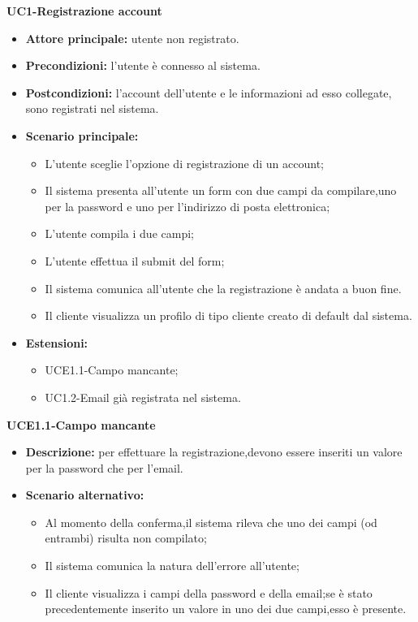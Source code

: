 \textbf{UC1-Registrazione account}
\begin{itemize}
    \item \textbf{Attore principale: }utente non registrato.
    \item \textbf{Precondizioni: }l'utente è connesso al sistema.
    \item \textbf{Postcondizioni: }l'account dell'utente e le informazioni ad esso collegate, sono registrati nel sistema.
    \item \textbf{Scenario principale:} 
        \begin{itemize}
            \item L'utente sceglie l'opzione di registrazione di un account;
            \item Il sistema presenta all'utente un form con due campi da compilare,uno per la password
            e uno per l'indirizzo di posta elettronica;
            \item L'utente compila i due campi;
            \item L'utente effettua il submit del form;
            \item Il sistema comunica all'utente che la registrazione è andata 
            a buon fine.
            \item Il cliente visualizza un profilo di tipo cliente creato di default dal sistema.
        \end{itemize}
    \item \textbf{Estensioni:}
        \begin{itemize}
                \item UCE1.1-Campo mancante;
                \item UC1.2-Email già registrata nel sistema.
        \end{itemize}
\end{itemize}
    
\textbf{UCE1.1-Campo mancante}
\begin{itemize}
    \item \textbf{Descrizione: }per effettuare la registrazione,devono essere inseriti un valore per la password che per l'email.
    \item \textbf{Scenario alternativo:}
    \begin{itemize}
        \item Al momento della conferma,il sistema rileva che uno dei campi (od entrambi) risulta non compilato;
        \item Il sistema comunica la natura dell'errore all'utente;
        \item Il cliente visualizza i campi della password e della email;se è stato precedentemente inserito un valore in uno
        dei due campi,esso è presente.
    \end{itemize}
\end{itemize}

